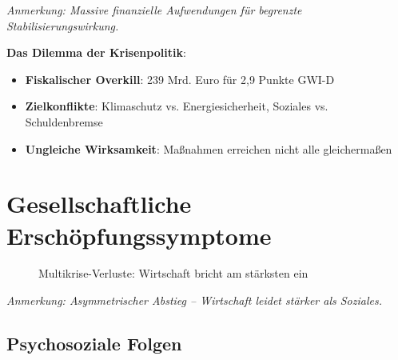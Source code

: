 \begin{flushleft}
\footnotesize{\textit{Anmerkung: Massive finanzielle Aufwendungen für begrenzte Stabilisierungswirkung.}}
\end{flushleft}

\textbf{Das Dilemma der Krisenpolitik}:

\begin{itemize}
    \item \textbf{Fiskalischer Overkill}: 239 Mrd. Euro für 2,9 Punkte GWI-D
    \item \textbf{Zielkonflikte}: Klimaschutz vs. Energiesicherheit, Soziales vs. Schuldenbremse
    \item \textbf{Ungleiche Wirksamkeit}: Maßnahmen erreichen nicht alle gleichermaßen
\end{itemize}

\section{Gesellschaftliche Erschöpfungssymptome}

\begin{figure}[ht]
    \centering
    \caption{Multikrise-Verluste: Wirtschaft bricht am stärksten ein}
    \label{fig:multikrise_verluste}
\end{figure}

\begin{flushleft}
\footnotesize{\textit{Anmerkung: Asymmetrischer Abstieg – Wirtschaft leidet stärker als Soziales.}}
\end{flushleft}

\subsection{Psychosoziale Folgen}

